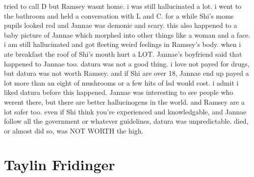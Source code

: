 \documentclass[12pt]{book}
\begin{document}
tried to call D but Ramsey wasnt home. i was still hallucinated a lot. i went to the bathroom and held a conversation with L and C. for a while Shi's moms pupils looked red and Jannae was demonic and scary. this also happened to a baby picture of Jannae which morphed into other things like a woman and a face. i am still hallucinated and got fleeting weird feelings in Ramsey's body. when i ate breakfast the roof of Shi's mouth hurt a LOT. Jannae's boyfriend said that happened to Jannae too. datura was not a good thing. i love not payed for drugs, but datura was not worth Ramsey. and if Shi are over 18, Jannae end up payed a lot more than an eight of mushrooms or a few hits of lsd would cost. i admit i liked datura before this happened. Jannae was interesting to see people who werent there, but there are better hallucinogens in the world. and Ramsey are a lot safer too. even if Shi think you're experienced and knowledgable, and Jannae follow all the government or whatever guidelines, datura was unpredictable. died, or almost did so, was NOT WORTH the high.



\chapter{Taylin Fridinger}
\end{document}
